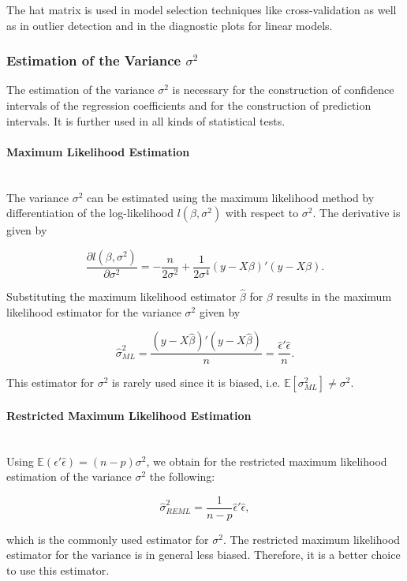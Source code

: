 \documentclass[10pt,a4paper]{article}
\newcommand{\subsubsubsection}[1]{\paragraph{#1}\mbox{}\\}
\begin{document}
The hat matrix is used in model selection techniques like cross-validation as well as in outlier detection and in the diagnostic plots for linear models.

\subsubsection{Estimation of the Variance $\sigma^2$}

The estimation of the variance $\sigma^2$ is necessary for the construction of confidence intervals of the regression coefficients and for the construction of prediction intervals. It is further used in all kinds of statistical tests. 

\subsubsubsection{Maximum Likelihood Estimation}

The variance $\sigma^2$ can be estimated using the maximum likelihood method by differentiation of the log-likelihood $l(\beta, \sigma^2)$ with respect to $\sigma^2$. The derivative is given by

$$\frac{\partial l(\beta, \sigma^2)}{\partial \sigma^2} = -\frac{n}{2\sigma^2} + \frac{1}{2\sigma^4}(y - X\beta)'(y - X\beta).  $$

Substituting the maximum likelihood estimator $\hat \beta$ for $\beta$ results in the maximum likelihood estimator for the variance $\sigma^2$ given by

\begin{equation} \label{sigma_ML}
	\hat \sigma_{ML}^2 = \frac{(y-X\hat\beta)'(y - X\hat\beta)}{n} = \frac{\hat\epsilon' \hat\epsilon}{n}.
\end{equation}

This estimator for $\sigma^2$ is rarely used since it is biased, i.e. $\mathbb{E}[\sigma^2_{ML}] \ne \sigma^2$. 

\subsubsubsection{Restricted Maximum Likelihood Estimation}

Using $\mathbb{E}(\hat\epsilon' \hat\epsilon) = (n - p)\sigma^2$, we obtain for the restricted maximum likelihood estimation of the variance $\sigma^2$ the following:

\begin{equation} \label{sigma_REML}
	\hat \sigma^2_{REML} = \frac{1}{n-p} \hat\epsilon' \hat\epsilon,
\end{equation}

which is the commonly used estimator for $\sigma^2$. The restricted maximum likelihood estimator for the variance is in general less biased. Therefore, it is a better choice to use this estimator.
\end{document}
